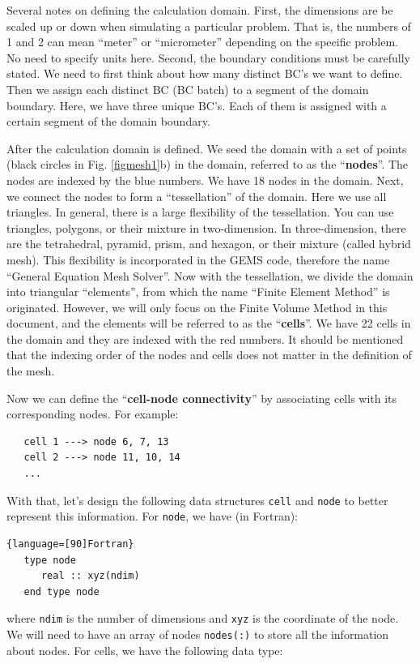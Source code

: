 \documentclass[12pt, letterpaper]{report}
\begin{document}
Several notes on defining the calculation domain. First, the dimensions are be scaled up or down
when simulating a particular problem. That is, the numbers of 1 and 2 can mean ``meter'' or
``micrometer'' depending on the specific problem. No need to specify units here. Second, the
boundary conditions must be carefully stated. We need to first think about how many distinct BC's we
want to define. Then we assign each distinct BC (BC batch) to a segment of the domain boundary. Here,
we have three unique BC's. Each of them is assigned with a certain segment of the domain boundary.
\paraspace

After the calculation domain is defined. We seed the domain with a set of points (black circles in
Fig. \ref{figmesh1}b) in the domain, referred to as the ``{\bf nodes}''. The nodes are indexed by
the blue numbers. We have 18 nodes in the domain. Next, we connect the nodes to form a
``tessellation'' of the domain. Here we use all triangles. In general, there is a large flexibility
of the tessellation. You can use triangles, polygons, or their mixture in two-dimension. In
three-dimension, there are the tetrahedral, pyramid, prism, and hexagon, or their mixture (called
hybrid mesh). This flexibility is incorporated in the GEMS code, therefore the name ``General
Equation Mesh Solver''.  Now with the tessellation, we divide the domain into triangular
``elements'', from which the name ``Finite Element Method'' is originated. However, we will only
focus on the Finite Volume Method in this document, and the elements will be referred to as the
``{\bf cells}''. We have 22 cells in the domain and they are indexed with the red numbers. It should
be mentioned that the indexing order of the nodes and cells does not matter in the definition of the mesh.
\paraspace

Now we can define the ``{\bf cell-node connectivity}'' by associating cells with its corresponding
nodes. For example:
\begin{verbatim}
   cell 1 ---> node 6, 7, 13
   cell 2 ---> node 11, 10, 14
   ...
\end{verbatim}
With that, let's design the following data structures \verb+cell+ and \verb+node+ to better
represent this information. For \verb+node+, we have (in Fortran):

\begin{lstlisting}{language=[90]Fortran}
   type node
      real :: xyz(ndim)
   end type node
\end{lstlisting}

where \verb+ndim+ is the number of dimensions and \verb+xyz+ is the coordinate of the node. We will
need to have an array of nodes \verb+nodes(:)+ to store all the information about nodes. For cells,
we have the following data type:
\end{document}
